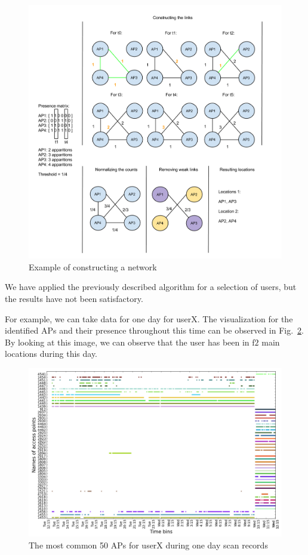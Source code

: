\begin{figure}[!h]
\centering
\includegraphics[width=1\textwidth]{figures/networks/net_constr_ex.png}
\caption{Example of constructing a network}
\label{network_calc_example}
\end{figure}

We have applied the previously described algorithm for a selection of users, but
the results have not been satisfactory.

For example, we can take data for one day for userX. The visualization for the
identified APs and their presence throughout this time can be observed in
Fig.~\ref{user_6_pres_1d}. By looking at this image, we can observe that the
user has been in f$2$ main locations during this day.

\begin{figure}[!h]
\centering
\includegraphics[width=\textwidth]{figures/networks/user_6_sorted_1days_no_rssi_plot.png}
\caption{The most common 50 APs for userX during one day scan records}
\label{user_6_pres_1d}
\end{figure}

